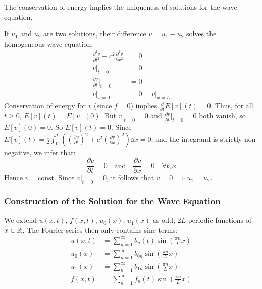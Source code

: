 \begin{theorem}[Uniqueness]
The conservation of energy implies the uniqueness of solutions for the wave equation.
\end{theorem}
\begin{proofbox}
If $u_1$ and $u_2$ are two solutions, their difference $v = u_1 - u_2$ solves the homogeneous wave equation:
\begin{align*}
    \frac{\partial^2 v}{\partial t^2} - c^2 \frac{\partial^2 v}{\partial x^2} &= 0 \\
    v|_{t=0} &= 0 \\
    \frac{\partial v}{\partial t}\bigg|_{t=0} &= 0 \\
    v|_{x=0} &= 0 = v|_{x=L}
\end{align*}
Conservation of energy for $v$ (since $f=0$) implies $\frac{\dd}{\dd t} E[v](t) = 0$.
Thus, for all $t \ge 0$, $E[v](t) = E[v](0)$.
But $v|_{t=0} = 0$ and $\frac{\partial v}{\partial t}|_{t=0} = 0$ both vanish, so $E[v](0) = 0$.
So $E[v](t) = 0$.
Since $E[v](t) = \frac{1}{2} \int_0^L \left( \left(\frac{\partial v}{\partial t}\right)^2 + c^2 \left(\frac{\partial v}{\partial x}\right)^2 \right) \dd x = 0$, and the integrand is strictly non-negative, we infer that:
\begin{equation*}
    \frac{\partial v}{\partial t} = 0 \quad \text{and} \quad \frac{\partial v}{\partial x} = 0 \quad \forall t, x
\end{equation*}
Hence $v = \text{const}$. Since $v|_{t=0} = 0$, it follows that $v = 0 \implies u_1 = u_2$.
\end{proofbox}

\subsubsection{Construction of the Solution for the Wave Equation}

We extend $u(x,t)$, $f(x,t)$, $u_0(x)$, $u_1(x)$ as odd, $2L$-periodic functions of $x \in \mathbb{R}$.
The Fourier series then only contains sine terms:
\begin{align*}
    u(x,t) &= \sum_{n=1}^{\infty} b_n(t) \sin\left(\frac{\pi n}{L} x\right) \\
    u_0(x) &= \sum_{n=1}^{\infty} b_{0n} \sin\left(\frac{\pi n}{L} x\right) \\
    u_1(x) &= \sum_{n=1}^{\infty} b_{1n} \sin\left(\frac{\pi n}{L} x\right) \\
    f(x,t) &= \sum_{n=1}^{\infty} f_n(t) \sin\left(\frac{\pi n}{L} x\right)
\end{align*}

